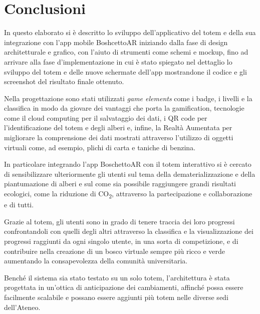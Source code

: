 \chapter{Conclusioni}
In questo elaborato si è descritto lo sviluppo dell'applicativo del totem e della sua integrazione con l'app mobile BoshcettoAR iniziando dalla fase di design architetturale e grafico, con l'aiuto di strumenti come schemi e mockup, fino ad arrivare alla fase d'implementazione in cui è stato spiegato nel dettaglio lo sviluppo del totem e delle nuove schermate dell'app mostrandone il codice e gli screenshot del risultato finale ottenuto.

Nella progettazione sono stati utilizzati \textit{game elements} come i badge, i livelli e la classifica in modo da giovare dei vantaggi che porta la gamification, tecnologie come il cloud computing per il salvataggio dei dati, i QR code per l'identificazione del totem e degli alberi e, infine, la Realtà Aumentata per migliorare la comprensione dei dati mostrati attraverso l'utilizzo di oggetti virtuali come, ad esempio, plichi di carta e taniche di benzina.

In particolare integrando l'app BoschettoAR con il totem interattivo si è cercato di sensibilizzare ulteriormente gli utenti sul tema della dematerializzazione e della piantumazione di alberi e sul come sia possibile raggiungere grandi risultati ecologici, come la riduzione di CO\textsubscript{2}, attraverso la partecipazione e collaborazione e di tutti.

Grazie al totem, gli utenti sono in grado di tenere traccia dei loro progressi confrontandoli con quelli degli altri attraverso la classifica e la visualizzazione dei progressi raggiunti da ogni singolo utente, in una sorta di competizione, e di contribuire nella creazione di un bosco virtuale sempre più ricco e verde aumentando la consapevolezza della comunità universitaria.

Benché il sistema sia stato testato su un solo totem, l’architettura è stata progettata in un’ottica di anticipazione dei cambiamenti, affinché possa essere facilmente scalabile e possano essere aggiunti più totem nelle diverse sedi dell’Ateneo.

